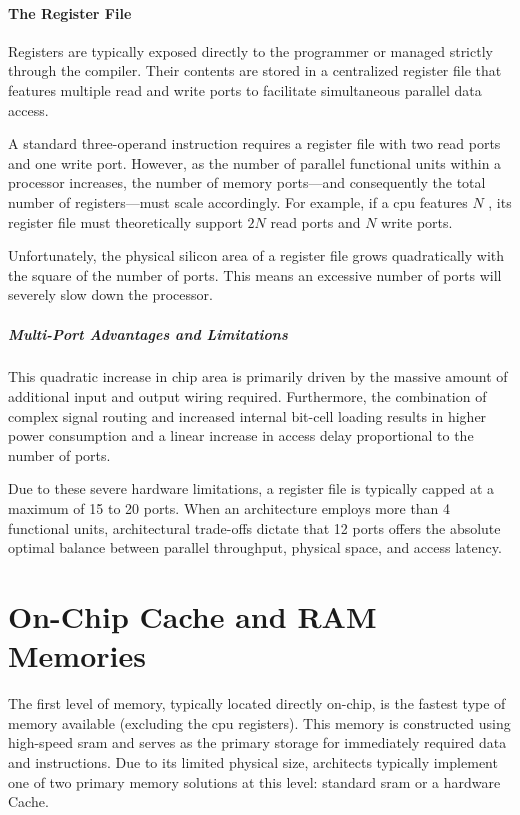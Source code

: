 \paragraph{The Register File} 
Registers are typically exposed directly to the programmer or managed strictly through the compiler. Their contents are stored in a centralized register file that features multiple read and write ports to facilitate simultaneous parallel data access. 

A standard three-operand instruction requires a register file with two read ports and one write port. However, as the number of parallel functional units within a processor increases, the number of memory ports—and consequently the total number of registers—must scale accordingly. For example, if a \gls{cpu} features $N$ , its register file must theoretically support $2N$ read ports and $N$ write ports. 

Unfortunately, the physical silicon area of a register file grows quadratically with the square of the number of ports. This means an excessive number of ports will severely slow down the processor.

\subparagraph{Multi-Port Advantages and Limitations} 
This quadratic increase in chip area is primarily driven by the massive amount of additional input and output wiring required. Furthermore, the combination of complex signal routing and increased internal bit-cell loading results in higher power consumption and a linear increase in access delay proportional to the number of ports. 

Due to these severe hardware limitations, a register file is typically capped at a maximum of 15 to 20 ports. When an architecture employs more than 4 functional units, architectural trade-offs dictate that 12 ports offers the absolute optimal balance between parallel throughput, physical space, and access latency.

\section{On-Chip Cache and RAM Memories}
The first level of memory, typically located directly on-chip, is the fastest type of memory available (excluding the \gls{cpu} registers). This memory is constructed using high-speed \gls{sram} and serves as the primary storage for immediately required data and instructions. Due to its limited physical size, architects typically implement one of two primary memory solutions at this level: standard \gls{sram} or a hardware Cache.

